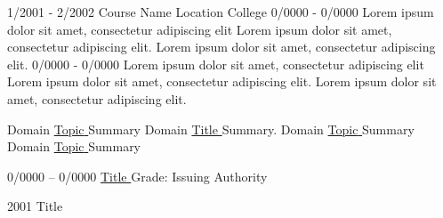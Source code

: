 \documentclass[a4paper,9pt]{developercv} %
\begin{document}
\begin{entrylist}
    \entry
		{1/2001 - 2/2002}
		{Course Name }
		{Location }
		{College}
    \entry
		{0/0000 - 0/0000}
		{Lorem ipsum dolor sit amet, consectetur adipiscing elit }
		{Lorem ipsum dolor sit amet, consectetur adipiscing elit. }
		{Lorem ipsum dolor sit amet, consectetur adipiscing elit.  }
	\entry
		{0/0000 - 0/0000}
		{Lorem ipsum dolor sit amet, consectetur adipiscing elit }
		{Lorem ipsum dolor sit amet, consectetur adipiscing elit. }
		{Lorem ipsum dolor sit amet, consectetur adipiscing elit.  }
   
\end{entrylist}

\vspace{-10 pt}
\begin{entrylist}
    \entry
		{Domain}
		 {\href{https://github.com/}{Topic{ } \faExternalLink}}
		{}
		{Summary}
    \entry
		{Domain}
		 {\href{https://github.com/}{Title { } \faExternalLink}}
		{}
		{Summary.}
	\entry
		{Domain}
		 {\href{https://github.com/}{{Topic} \faExternalLink}}
		{}
		{Summary}
	\entry
 {Domain}
		 {\href{https://github.com/}{Topic{  }\faExternalLink}}
		{}
		{Summary}
		
\end{entrylist}

\vspace{-10 pt}
\begin{entrylist}
    \entry
    {0/0000 -- 0/0000}
    {\href{}
    {Title \faExternalLink}}
    {Grade: }
    {Issuing Authority}
\end{entrylist}

\vspace{-10 pt}
\begin{entrylist}
	\entry
        {2001}
		{Title}
		{}
		{\vspace{-10pt}
       
          \texttt{}}
	
	
		
\end{entrylist}
\end{document}

